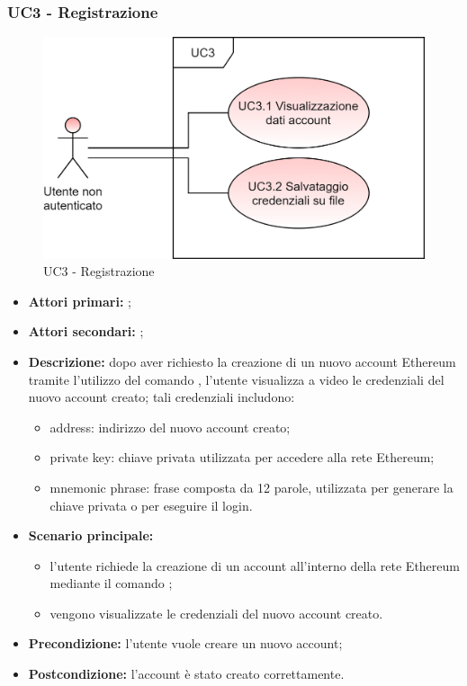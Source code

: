 \subsubsection{UC3 - Registrazione}
\begin{figure}[H]
	\centering
	\includegraphics[scale=\ucs]{./res/img/UC3.png}
	\caption {UC3 - Registrazione}
\end{figure}
\begin{itemize}
	\item \textbf{Attori primari:} \una{};
	\item \textbf{Attori secondari:} \re{};
	\item \textbf{Descrizione:} dopo aver richiesto la creazione di un nuovo account Ethereum tramite l’utilizzo del comando \signup{}, l’utente visualizza a video le credenziali del nuovo account creato; tali credenziali includono:
	\begin{itemize}
		\item address: indirizzo del nuovo account creato;
		\item private key: chiave privata utilizzata per accedere alla rete Ethereum;
		\item mnemonic phrase: frase composta da 12 parole, utilizzata per generare la chiave privata o per eseguire il login.
	\end{itemize}
	\item \textbf{Scenario principale:}
	\begin{itemize}
		\item l’utente richiede la creazione di un account all’interno della rete Ethereum mediante il comando \signup{};
		\item vengono visualizzate le credenziali del nuovo account creato. 
	\end{itemize}
	\item \textbf{Precondizione:} l'utente vuole creare un nuovo account; 
	\item \textbf{Postcondizione:} l’account è stato creato correttamente. 
\end{itemize}